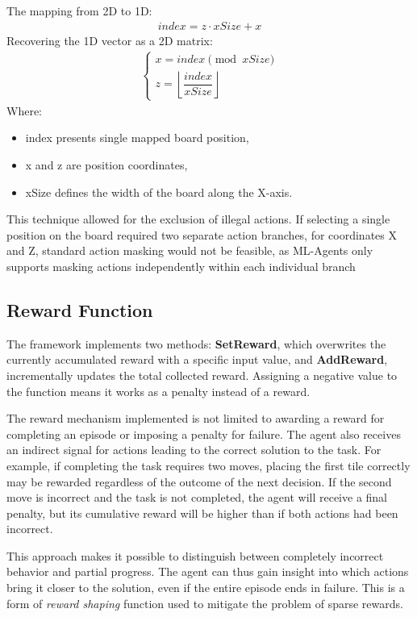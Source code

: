 The mapping from 2D to 1D:
\begin{align}
	index = z \cdot xSize + x
\end{align}
Recovering the 1D vector as a 2D matrix:
\begin{align}
	\begin{cases}
		x = index\pmod{xSize} \\
		z = \left\lfloor \dfrac{index}{xSize} \right\rfloor
	\end{cases}
\end{align}
Where:
\begin{itemize}
	\item index presents single mapped board position,
	\item x and z are position coordinates,
	\item xSize defines the width of the board along the X-axis.
\end{itemize}
This technique allowed for the exclusion of illegal actions. If selecting a single position on the board required two separate action branches, for coordinates X and Z, standard action masking would not be feasible, as ML-Agents only supports masking actions independently within each individual branch

\subsection{Reward Function}
The framework implements two methods: \textbf{SetReward}, which overwrites the currently accumulated reward with a specific input value, and \textbf{AddReward}, incrementally updates the total collected reward. Assigning a negative value to the function means it works as a penalty instead of a reward.

The reward mechanism implemented is not limited to awarding a reward for completing an episode or imposing a penalty for failure. The agent also receives an indirect signal for actions leading to the correct solution to the task. For example, if completing the task requires two moves, placing the first tile correctly may be rewarded regardless of the outcome of the next decision. If the second move is incorrect and the task is not completed, the agent will receive a final penalty, but its cumulative reward will be higher than if both actions had been incorrect. %

This approach makes it possible to distinguish between completely incorrect behavior and partial progress. The agent can thus gain insight into which actions bring it closer to the solution, even if the entire episode ends in failure. This is a form of \textit{reward shaping} function used to mitigate the problem of sparse rewards.

